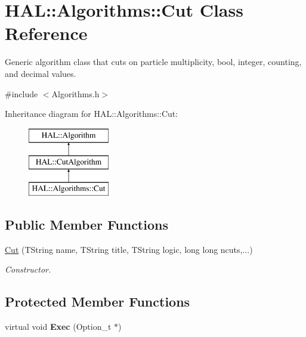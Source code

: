 \hypertarget{class_h_a_l_1_1_algorithms_1_1_cut}{\section{H\-A\-L\-:\-:Algorithms\-:\-:Cut Class Reference}
\label{class_h_a_l_1_1_algorithms_1_1_cut}
}


Generic algorithm class that cuts on particle multiplicity, bool, integer, counting, and decimal values.  




{\ttfamily \#include $<$Algorithms.\-h$>$}

Inheritance diagram for H\-A\-L\-:\-:Algorithms\-:\-:Cut\-:\begin{figure}[H]
\begin{center}
\leavevmode
\includegraphics[height=3.000000cm]{class_h_a_l_1_1_algorithms_1_1_cut}
\end{center}
\end{figure}
\subsection*{Public Member Functions}
\begin{DoxyCompactItemize}
\item 
\hyperlink{class_h_a_l_1_1_algorithms_1_1_cut_a91f1ee2770d1a90d503cd1b6300dbce2}{Cut} (T\-String name, T\-String title, T\-String logic, long long ncuts,...)
\begin{DoxyCompactList}\small\item\em Constructor. \end{DoxyCompactList}\end{DoxyCompactItemize}
\subsection*{Protected Member Functions}
\begin{DoxyCompactItemize}
\item 
\hypertarget{class_h_a_l_1_1_algorithms_1_1_cut_aa1257616a4912852aa4ce2eb849e2ead}{virtual void {\bfseries Exec} (Option\-\_\-t $\ast$)}\label{class_h_a_l_1_1_algorithms_1_1_cut_aa1257616a4912852aa4ce2eb849e2ead}

\end{DoxyCompactItemize}
